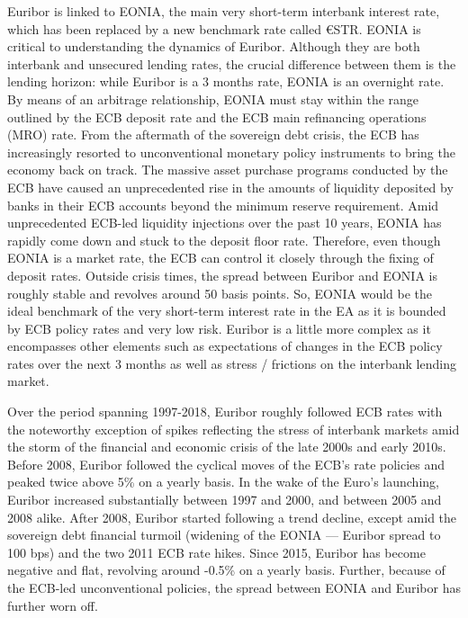 \documentclass[
  11pt,
]{article}
\begin{document}
Euribor is linked to EONIA, the main very short-term interbank interest rate, which has been replaced by a new benchmark rate called €STR.
EONIA is critical to understanding the dynamics of Euribor.
Although they are both interbank and unsecured lending rates, the crucial difference between them is the lending horizon: while Euribor is a 3 months rate, EONIA is an overnight rate.
By means of an arbitrage relationship, EONIA must stay within the range outlined by the ECB deposit rate and the ECB main refinancing operations (MRO) rate.
From the aftermath of the sovereign debt crisis, the ECB has increasingly resorted to unconventional monetary policy instruments to bring the economy back on track.
The massive asset purchase programs conducted by the ECB have caused an unprecedented rise in the amounts of liquidity deposited by banks in their ECB accounts beyond the minimum reserve requirement.
Amid unprecedented ECB-led liquidity injections over the past 10 years, EONIA has rapidly come down and stuck to the deposit floor rate.
Therefore, even though EONIA is a market rate, the ECB can control it closely through the fixing of deposit rates.
Outside crisis times, the spread between Euribor and EONIA is roughly stable and revolves around 50 basis points.
So, EONIA would be the ideal benchmark of the very short-term interest rate in the EA as it is bounded by ECB policy rates and very low risk.
Euribor is a little more complex as it encompasses other elements such as expectations of changes in the ECB policy rates over the next 3 months as well as stress / frictions on the interbank lending market.

Over the period spanning 1997-2018, Euribor roughly followed ECB rates with the noteworthy exception of spikes reflecting the stress of interbank markets amid the storm of the financial and economic crisis of the late 2000s and early 2010s.
Before 2008, Euribor followed the cyclical moves of the ECB's rate policies and peaked twice above 5\% on a yearly basis.
In the wake of the Euro's launching, Euribor increased substantially between 1997 and 2000, and between 2005 and 2008 alike.
After 2008, Euribor started following a trend decline, except amid the sovereign debt financial turmoil (widening of the EONIA --- Euribor spread to 100 bps) and the two 2011 ECB rate hikes.
Since 2015, Euribor has become negative and flat, revolving around -0.5\% on a yearly basis. Further, because of the ECB-led unconventional policies, the spread between EONIA and Euribor has further worn off.
\end{document}
